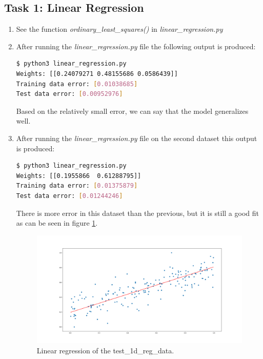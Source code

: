 \documentclass[a4paper]{article}
\begin{document}
\subsection*{Task 1: Linear Regression}
    \begin{enumerate}
        \item
            See the function \emph{ordinary\_least\_squares()} in \emph{linear\_regression.py}
        \item 
            After running the \emph{linear\_regression.py} file the following output is produced:
            \begin{lstlisting}[language=bash]
$ python3 linear_regression.py
Weights: [[0.24079271 0.48155686 0.0586439]]
Training data error: [0.01038685]
Test data error: [0.00952976]
            \end{lstlisting}
            Based on the relatively small error, we can say that the model generalizes well.

        \item
            After running the \emph{linear\_regression.py} file on the second dataset this
            output is produced:
            \begin{lstlisting}[language=bash]
$ python3 linear_regression.py
Weights: [[0.1955866  0.61288795]]
Training data error: [0.01375879]
Test data error: [0.01244246]
            \end{lstlisting}

            There is more error in this dataset than the previous, but it is still
            a good fit as can be seen in figure
            \ref{fig:linear-regression}.
            \begin{figure}[ht]
                \includegraphics[width=\linewidth]{linear_regression.png}
                \caption{Linear regression of the test\_1d\_reg\_data.}
                \label{fig:linear-regression}
            \end{figure}
    \end{enumerate}
\end{document}
